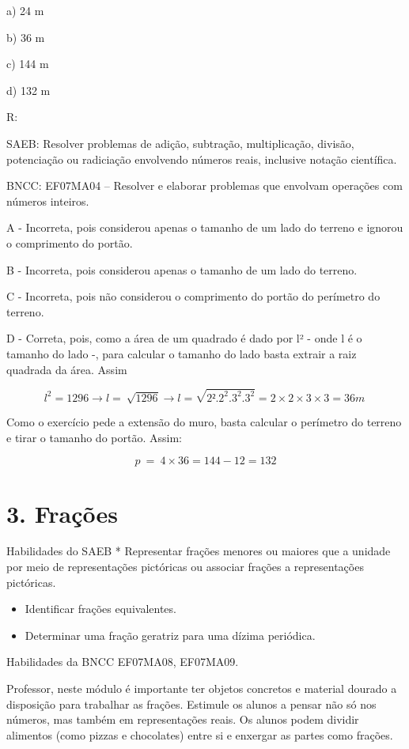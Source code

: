a) 24 m

b) 36 m

c) 144 m

d) 132 m

R:

SAEB: Resolver problemas de adição, subtração, multiplicação, divisão,
potenciação ou radiciação envolvendo números reais, inclusive notação
científica.

BNCC: EF07MA04 -- Resolver e elaborar problemas que envolvam operações
com números inteiros.

A - Incorreta, pois considerou apenas o tamanho de um lado do terreno e
ignorou o comprimento do portão.

B - Incorreta, pois considerou apenas o tamanho de um lado do terreno.

C - Incorreta, pois não considerou o comprimento do portão do perímetro
do terreno.

D - Correta, pois, como a área de um quadrado é dado por l² - onde l é o
tamanho do lado -, para calcular o tamanho do lado basta extrair a raiz
quadrada da área. Assim

\[l^{2} = 1296 \rightarrow l = \ \sqrt{1296} \rightarrow l = \sqrt{2².2^{2}.3^{2}.3^{2}} = 2 \times 2 \times 3 \times 3 = 36m\ \]

Como o exercício pede a extensão do muro, basta calcular o perímetro do
terreno e tirar o tamanho do portão. Assim:

\[p\  = \ 4 \times 36 = 144 - 12 = 132\]

\hypertarget{frauxe7uxf5es}{%
\section{3. Frações}\label{frauxe7uxf5es}}

Habilidades do SAEB * Representar frações menores ou maiores que a
unidade por meio de representações pictóricas ou associar frações a
representações pictóricas.

\begin{itemize}
\item
  Identificar frações equivalentes.
\item
  Determinar uma fração geratriz para uma dízima periódica.
\end{itemize}

Habilidades da BNCC EF07MA08, EF07MA09.

Professor, neste módulo é importante ter objetos concretos e material
dourado a disposição para trabalhar as frações. Estimule os alunos a
pensar não só nos números, mas também em representações reais. Os alunos
podem dividir alimentos (como pizzas e chocolates) entre si e enxergar
as partes como frações.

